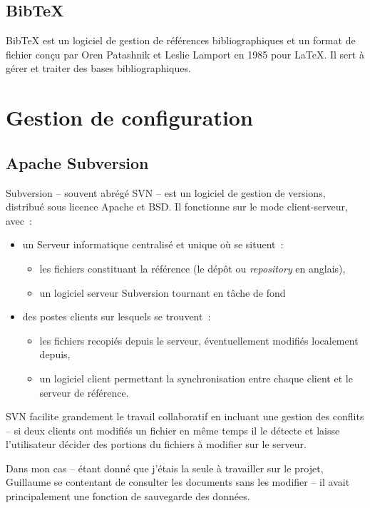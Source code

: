 		
		\subsection{BibTeX}
			BibTeX est un logiciel de gestion de références bibliographiques et un format de fichier conçu par Oren Patashnik et Leslie Lamport en 1985 pour \LaTeX. Il sert à gérer et traiter des bases bibliographiques.
		
		
\section{Gestion de configuration}
	\subsection{Apache Subversion}
		Subversion -- souvent abrégé SVN -- est un logiciel de gestion de versions, distribué sous licence Apache et BSD. Il fonctionne sur le mode client-serveur, avec~:
		\begin{itemize}
			\item un Serveur informatique centralisé et unique où se situent~:
			\begin{itemize}
				\item les fichiers constituant la référence (le dépôt ou \textit{repository} en anglais),
				\item un logiciel serveur Subversion tournant en tâche de fond
			\end{itemize}
			\item des postes clients sur lesquels se trouvent~:
			\begin{itemize}
				\item les fichiers recopiés depuis le serveur, éventuellement modifiés localement depuis,
				\item un logiciel client permettant la synchronisation entre chaque client et le serveur de référence.
			\end{itemize}
		\end{itemize}
		
		SVN facilite grandement le travail collaboratif en incluant une gestion des conflits -- si deux clients ont modifiés un fichier en même temps il le détecte et laisse l'utilisateur décider des portions du fichiers à modifier sur le serveur.
		
		Dans mon cas -- étant donné que j'étais la seule à travailler sur le projet, Guillaume se contentant de consulter les documents sans les modifier -- il avait principalement une fonction de sauvegarde des données.